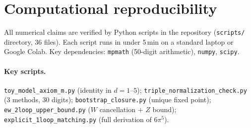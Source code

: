 \documentclass[11pt,a4paper]{article}
\begin{document}
\section*{Computational reproducibility}

All numerical claims are verified by Python scripts in the repository
(\texttt{scripts/} directory, 36 files). Each script runs in under 5\,min
on a standard laptop or Google Colab. Key dependencies: \texttt{mpmath}
(50-digit arithmetic), \texttt{numpy}, \texttt{scipy}.

\paragraph{Key scripts.}
\texttt{toy\_model\_axiom\_m.py} (identity in $d=1$--$5$);
\texttt{triple\_normalization\_check.py} (3 methods, 30 digits);
\texttt{bootstrap\_closure.py} (unique fixed point);
\texttt{ew\_2loop\_upper\_bound.py} ($W$ cancellation $+$ $Z$ bound);
\texttt{explicit\_1loop\_matching.py} (full derivation of $6\pi^5$).

\vfill
\end{document}

